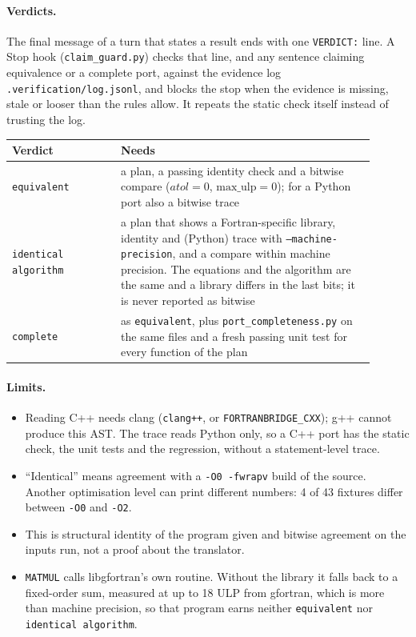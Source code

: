 \documentclass[11pt,a4paper]{article}
\theoremstyle{definition}
\begin{document}
\paragraph{Verdicts.} The final message of a turn that states a result ends with one \texttt{VERDICT:} line. A Stop hook (\texttt{claim\_guard.py}) checks that line, and any sentence claiming equivalence or a complete port, against the evidence log \texttt{.verification/log.jsonl}, and blocks the stop when the evidence is missing, stale or looser than the rules allow. It repeats the static check itself instead of trusting the log.

\begin{center}
\begin{tabular}{@{}p{0.27\linewidth}p{0.63\linewidth}@{}}
\toprule
Verdict & Needs \\
\midrule
\texttt{equivalent} & a plan, a passing identity check and a bitwise compare ($atol=0$, $\mathrm{max\_ulp}=0$); for a Python port also a bitwise trace \\
\texttt{identical algorithm} & a plan that shows a Fortran-specific library, identity and (Python) trace with \texttt{--machine-precision}, and a compare within machine precision. The equations and the algorithm are the same and a library differs in the last bits; it is never reported as bitwise \\
\texttt{complete} & as \texttt{equivalent}, plus \texttt{port\_completeness.py} on the same files and a fresh passing unit test for every function of the plan \\
\bottomrule
\end{tabular}
\end{center}

\paragraph{Limits.}
\begin{itemize}
    \item Reading C++ needs clang (\texttt{clang++}, or \texttt{FORTRANBRIDGE\_CXX}); g++ cannot produce this AST. The trace reads Python only, so a C++ port has the static check, the unit tests and the regression, without a statement-level trace.
    \item ``Identical'' means agreement with a \texttt{-O0 -fwrapv} build of the source. Another optimisation level can print different numbers: 4 of 43 fixtures differ between \texttt{-O0} and \texttt{-O2}.
    \item This is structural identity of the program given and bitwise agreement on the inputs run, not a proof about the translator.
    \item \texttt{MATMUL} calls libgfortran's own routine. Without the library it falls back to a fixed-order sum, measured at up to 18 ULP from gfortran, which is more than machine precision, so that program earns neither \texttt{equivalent} nor \texttt{identical algorithm}.
\end{itemize}
\end{document}
